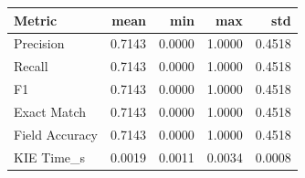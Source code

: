 \begin{tabular}{lrrrr}
\toprule
Metric & mean & min & max & std \\
\midrule
Precision & 0.7143 & 0.0000 & 1.0000 & 0.4518 \\
Recall & 0.7143 & 0.0000 & 1.0000 & 0.4518 \\
F1 & 0.7143 & 0.0000 & 1.0000 & 0.4518 \\
Exact Match & 0.7143 & 0.0000 & 1.0000 & 0.4518 \\
Field Accuracy & 0.7143 & 0.0000 & 1.0000 & 0.4518 \\
KIE Time_s & 0.0019 & 0.0011 & 0.0034 & 0.0008 \\
\bottomrule
\end{tabular}
